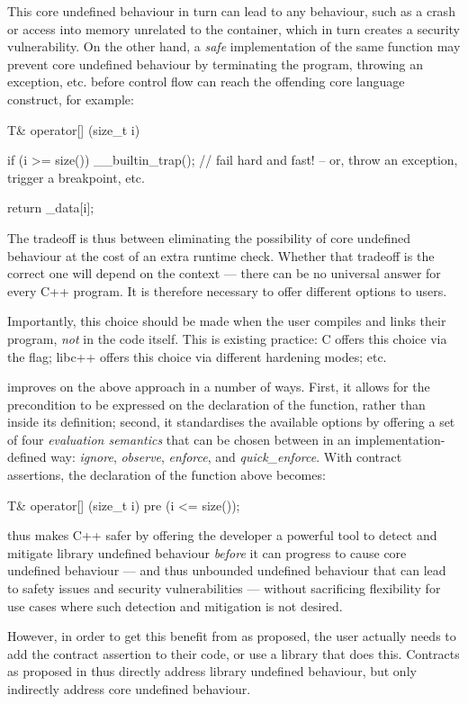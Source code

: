 This core undefined behaviour in turn can lead to any behaviour, such as a crash or access into memory unrelated to the container, which in turn creates a security vulnerability. On the other hand, a \emph{safe} implementation of the same function may prevent core undefined behaviour by terminating the program, throwing an exception, etc. before control flow can reach the offending core language construct, for example:
\begin{codeblock}
T& operator[] (size_t i) {
  if (i >= size())
    __builtin_trap(); // fail hard and fast! -- or, throw an exception, trigger a breakpoint, etc.
    
  return _data[i];
}
\end{codeblock}
The tradeoff is thus between eliminating the possibility of core undefined behaviour at the cost of an extra runtime check. Whether that tradeoff is the correct one will depend on the context --- there can be no universal answer for every C++ program. It is therefore necessary to offer different options to users.

Importantly, this choice should be made when the user compiles and links their program, \emph{not} in the code itself. This is existing practice: C  offers this choice via the  flag; libc++ offers this choice via different hardening modes; etc.

\cite{P2900R8} improves on the above approach in a number of ways. First, it allows for the precondition to be expressed on the declaration of the function, rather than inside its definition; second, it standardises the available options by offering a set of four \emph{evaluation semantics} that can be chosen between in an implementation-defined way: \emph{ignore}, \emph{observe}, \emph{enforce}, and \emph{quick_enforce}. With \cite{P2900R8} contract assertions, the declaration of the function above becomes:
\begin{codeblock}
T& operator[] (size_t i)
pre (i <= size());
\end{codeblock}
\cite{P2900R8} thus makes C++ safer by offering the developer a powerful tool to detect and mitigate library undefined behaviour \emph{before} it can progress to cause core undefined behaviour --- and thus unbounded undefined behaviour that can lead to safety issues and security vulnerabilities --- without sacrificing flexibility for use cases where such detection and mitigation is not desired.

However, in order to get this benefit from \cite{P2900R8} as proposed, the user actually needs to add the contract assertion  to their code, or use a library that does this. Contracts as proposed in \cite{P2900R8} thus directly address library undefined behaviour, but only indirectly address core undefined behaviour.

